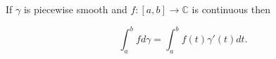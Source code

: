 If $\gamma$ is piecewise smooth and $f:[a,b] \to \mathbb{C}$ is continuous then

$$\int_a^b fd\gamma = \int_a^b f(t)\gamma'(t) dt.$$